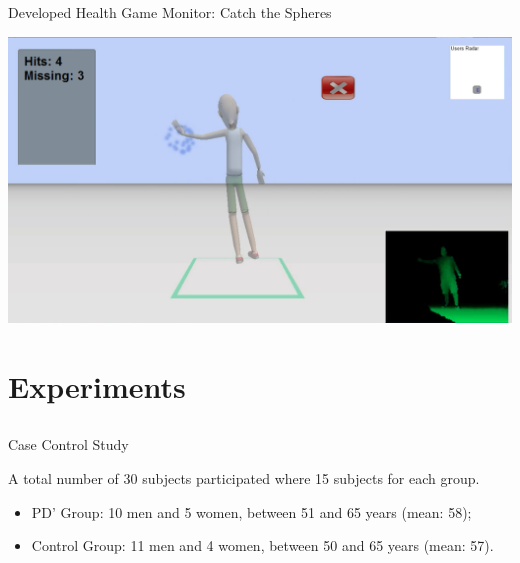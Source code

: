 \documentclass{beamer}
\begin{document}

\begin{frame}{Developed Health Game Monitor: Catch the Spheres}
	\begin{center}
      \center \includegraphics[height=2.2 in]{img/catch_colour.png}
	\end{center}
\end{frame}

\section{Experiments}
\subsection{}
\begin{frame}{Case Control Study}
	\begin{block}{}
	A total number of 30 subjects participated where 15 subjects for each group.
		\begin{itemize}
			\item PD' Group: 10 men and 5 women, between 51 and 65 years (mean: 58);
			\item Control Group: 11 men and 4 women, between 50 and 65 years (mean: 57).
		\end{itemize}
	\end{block}
\end{frame}
\end{document}
